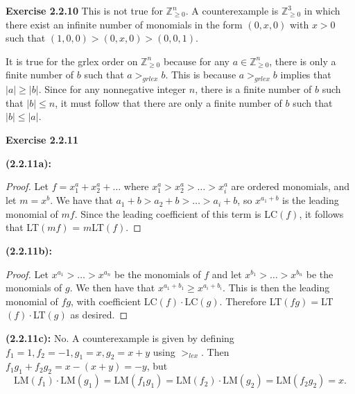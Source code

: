 \documentclass[12pt,oneside]{article}
\newenvironment{exercise}[1]{\vspace{.1in}\noindent\textbf{Exercise #1 \hspace{.05em}}}{}
\newcommand{\Z}{\mathbb{Z}}
\begin{document}

\begin{exercise}{2.2.10}
    This is not true for $\Z_{\geq 0}^n$. A counterexample is $\Z_{\geq 0}^3$ 
    in which there exist an infinite number of monomials in the form $(0,x,0)$ 
    with $x>0$ such that $(1,0,0)>(0,x,0)>(0,0,1)$. 
    
    It is true for the grlex order 
    on $\Z_{\geq 0}^n$ because for any $a \in \Z_{\geq 0}^n$, there is only a 
    finite number of $b$ such that $a >_{grlex} b$. This is because $a>_{grlex}b$
    implies that $|a| \geq |b|$. Since for any nonnegative integer $n$, there is 
    a finite number of $b$ such that $|b|\leq n$, it must follow that there are 
    only a finite number of $b$ such that $|b|\leq|a|$.
\end{exercise}

\newpage
\begin{exercise}{2.2.11}

    \bigskip
    \textbf{(2.2.11a):}
    \begin{proof}
        Let $f = x^a_1+x^a_2+\ldots$ where $x^a_1 > x^a_2 > \ldots > x^a_i$ 
        are ordered monomials, and let $m=x^b$. We have that $a_1+b>a_2+b > \ldots > a_i+b$,
        so $x^{a_1+b}$ is the leading monomial of $mf$. Since the leading coefficient 
        of this term is LC$(f)$, it follows that LT$(mf)$ = $m$LT$(f)$.
    \end{proof}

    \bigskip
    \textbf{(2.2.11b):}
    \begin{proof}
        Let $x^{a_1} > \ldots > x^{a_n}$ be the monomials of $f$ and let 
        $x^{b_1} > \ldots > x^{b_n}$ be the monomials of $g$. We then have that 
        $x^{a_1+b_1} \geq x^{a_i+b_i}$. This is then the leading monomial of $fg$, 
        with coefficient LC$(f) \cdot$LC$(g)$. Therefore LT$(fg) =$LT$(f)\cdot$LT$(g)$ 
        as desired.
    \end{proof}

    \bigskip
    \textbf{(2.2.11c):}
    No. A counterexample is given by defining $f_1=1, f_2=-1, g_1=x, g_2=x+y$ 
    using $>_{lex}$. Then $f_1g_1+f_2g_2=x-(x+y)=-y$, but
    \[ 
        \text{LM}(f_1)\cdot\text{LM}(g_1)=\text{LM}(f_1g_1)=\text{LM}(f_2)\cdot\text{LM}(g_2)=\text{LM}(f_2g_2)=x.
    \]
\end{exercise}


\end{document}
